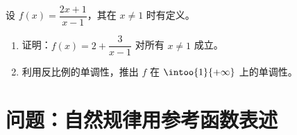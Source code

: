 \begin{exercise}[$\star\star\star$]\label{exo:g10:reffunc:10}
设 $f(x) = \dfrac{2x + 1}{x - 1}$，其在 $x \neq 1$ 时有定义。
\begin{enumerate}
  \item 证明：$f(x) = 2 + \dfrac{3}{x - 1}$ 对所有 $x \neq 1$ 成立。
  \item 利用反比例的单调性，推出 $f$ 在 $\intoo{1}{+\infty}$
        上的单调性。
\end{enumerate}
\end{exercise}

\section{问题：自然规律用参考函数表述}

